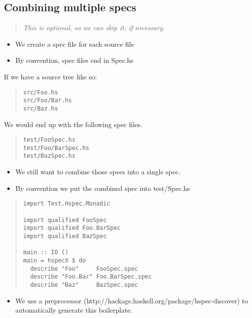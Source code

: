 \documentclass[preprint]{sigplanconf}
\begin{document}
\subsection{Combining multiple specs}

\begin{quote}
\emph{This is optional, so we can skip it, if necessary.}
\end{quote}

\begin{itemize}
\item We create a spec file for each source file
\item By convention, spec files end in Spec.hs
\end{itemize}

\noindent If we have a source tree like so:

\begin{quote}
\small
\begin{verbatim}
src/Foo.hs
src/Foo/Bar.hs
src/Baz.hs
\end{verbatim}
\end{quote}

\noindent We would end up with the following spec files.

\begin{quote}
\small
\begin{verbatim}
test/FooSpec.hs
test/Foo/BarSpec.hs
test/BazSpec.hs
\end{verbatim}
\end{quote}

\begin{itemize}
\item We still want to combine those specs into a single spec.
\item By convention we put the combined spec into test/Spec.hs
\end{itemize}

\begin{quote}
\small
\begin{verbatim}
import Test.Hspec.Monadic

import qualified FooSpec
import qualified Foo.BarSpec
import qualified BazSpec

main :: IO ()
main = hspecX $ do
  describe "Foo"     FooSpec.spec
  describe "Foo.Bar" Foo.BarSpec.spec
  describe "Baz"     BazSpec.spec
\end{verbatim}
\end{quote}

\begin{itemize}
\item We use a preprocessor (http://hackage.haskell.org/package/hspec-discover) to automatically generate this boilerplate.
\end{itemize}
\end{document}
